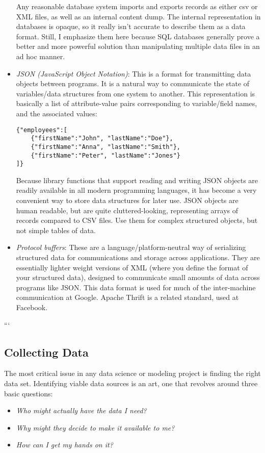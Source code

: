 \documentclass[10pt]{article}
\begin{document}
\begin{itemize}
Any reasonable database system imports and exports records as either csv or XML files, as well as an internal content dump. The internal representation in databases is opaque, so it really isn't accurate to describe them as a data format. Still, I emphasize them here because SQL databases generally prove a better and more powerful solution than manipulating multiple data files in an ad hoc manner.
  \item \textit{JSON (JavaScript Object Notation)}: This is a format for transmitting data objects between programs. It is a natural way to communicate the state of variables/data structures from one system to another. This representation is basically a list of attribute-value pairs corresponding to variable/field names, and the associated values:
\begin{verbatim}
{"employees":[
    {"firstName":"John", "lastName":"Doe"},
    {"firstName":"Anna", "lastName":"Smith"},
    {"firstName":"Peter", "lastName":"Jones"}
]}
\end{verbatim}
Because library functions that support reading and writing JSON objects are readily available in all modern programming languages, it has become a very convenient way to store data structures for later use. JSON objects are human readable, but are quite cluttered-looking, representing arrays of records compared to CSV files. Use them for complex structured objects, but not simple tables of data.
  \item \textit{Protocol buffers}: These are a language/platform-neutral way of serializing structured data for communications and storage across applications. They are essentially lighter weight versions of XML (where you define the format of your structured data), designed to communicate small amounts of data across programs like JSON. This data format is used for much of the inter-machine communication at Google. Apache Thrift is a related standard, used at Facebook.
\end{itemize}
```
\subsection{Collecting Data}
The most critical issue in any data science or modeling project is finding the right data set. Identifying viable data sources is an art, one that revolves around three basic questions:

\begin{itemize}
  \item \textit{Who might actually have the data I need?}
  \item \textit{Why might they decide to make it available to me?}
  \item \textit{How can I get my hands on it?}
\end{itemize}
\end{document}
